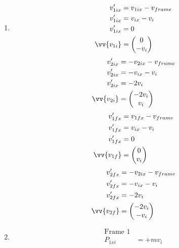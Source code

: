 \documentclass[11pt,letterpaper, twocolumn]{article}
\begin{document}
\begin{enumerate}[label=(\alph*)]
\begin{center}
\end{center}
    \item \begin{align*}
        v_{1ix}'&=v_{1ix}-v_{frame}\\
        v_{1ix}'&=v_{ix}-v_{i}\\
        v_{1ix}'&=0\\
        \vv{v_{1i}}&=\begin{pmatrix}0\\-v_i\end{pmatrix}\\
    \end{align*}
    \begin{align*}
        v_{2ix}'&=-v_{2ix}-v_{frame}\\
        v_{2ix}'&=-v_{ix}-v_{i}\\
        v_{2ix}'&=-2v_{i}\\
        \vv{v_{2i}}&=\begin{pmatrix}-2v_i\\v_i\end{pmatrix}
    \end{align*}
    \begin{align*}
        v_{1fx}'&=v_{1fx}-v_{frame}\\
        v_{1fx}'&=v_{ix}-v_{i}\\
        v_{1fx}'&=0\\
        \vv{v_{1f}}&=\begin{pmatrix}0\\v_i\end{pmatrix}\\
    \end{align*}
    \begin{align*}
        v_{2fx}'&=-v_{2ix}-v_{frame}\\
        v_{2fx}'&=-v_{ix}-v_{i}\\
        v_{2fx}'&=-2v_{i}\\
        \vv{v_{2f}}&=\begin{pmatrix}-2v_i\\-v_i\end{pmatrix}
    \end{align*}
    \item \begin{align*}
        \text{Frame 1}\\
        P_{1xi} &= +mv_i\\

\end{align*}
\end{enumerate}
\end{document}
